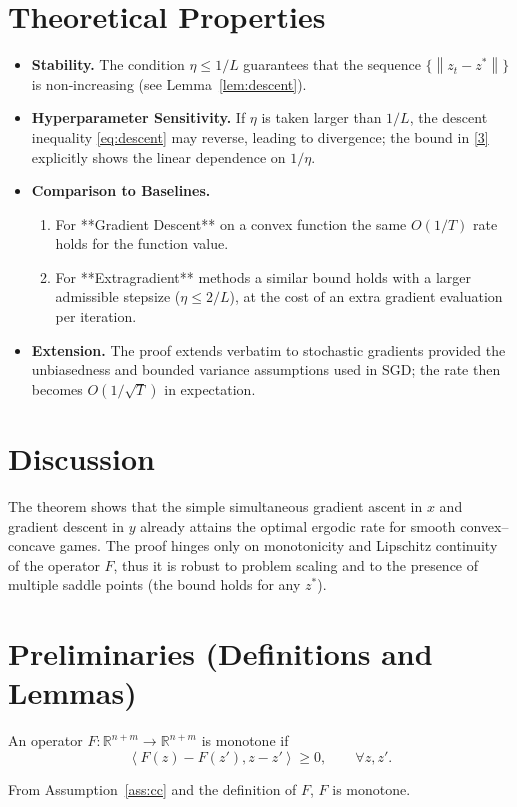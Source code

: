 \documentclass{article}
\newcommand{\norm}[1]{\left\|#1\right\|}
\newcommand{\inner}[2]{\left\langle #1,#2 \right\rangle}
\begin{document}
\section*{Theoretical Properties}
\begin{itemize}
\item \textbf{Stability.} The condition $\eta\le1/L$ guarantees that the sequence $\{\norm{z_{t}-z^{*}}\}$ is non‑increasing (see Lemma~\ref{lem:descent}).
\item \textbf{Hyperparameter Sensitivity.} If $\eta$ is taken larger than $1/L$, the descent inequality \eqref{eq:descent} may reverse, leading to divergence; the bound in \eqref{3} explicitly shows the linear dependence on $1/\eta$.
\item \textbf{Comparison to Baselines.}
    \begin{enumerate}
    \item For **Gradient Descent** on a convex function the same $O(1/T)$ rate holds for the function value.
    \item For **Extragradient** methods a similar bound holds with a larger admissible stepsize ($\eta\le2/L$), at the cost of an extra gradient evaluation per iteration.
    \end{enumerate}
\item \textbf{Extension.} The proof extends verbatim to stochastic gradients provided the unbiasedness and bounded variance assumptions used in SGD; the rate then becomes $O(1/\sqrt{T})$ in expectation.
\end{itemize}

\section*{Discussion}
The theorem shows that the simple simultaneous gradient ascent in $x$ and gradient descent in $y$ already attains the optimal ergodic rate for smooth convex–concave games. The proof hinges only on monotonicity and Lipschitz continuity of the operator $F$, thus it is robust to problem scaling and to the presence of multiple saddle points (the bound holds for any $z^{*}$).

\newpage

\section*{Preliminaries (Definitions and Lemmas)}
\begin{definition}
An operator $F:\mathbb{R}^{n+m}\to\mathbb{R}^{n+m}$ is monotone if  
\[
\inner{F(z)-F(z')}{z-z'}\ge0,\qquad\forall z,z'.
\]
\end{definition}
From Assumption~\ref{ass:cc} and the definition of $F$, $F$ is monotone.
\end{document}

